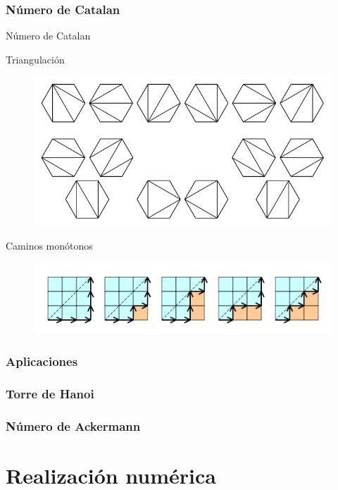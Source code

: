 \documentclass[spanish, utf8,handout]{beamer} %
\theoremstyle{definition}
\begin{document}
\subsubsection{Número de Catalan}
\begin{frame}{Número de Catalan}
	\begin{block}{Triangulación}
		\begin{figure}
		\centering
		 \includegraphics[scale=0.15]{ca1}
		\end{figure}
	\end{block}
\begin{block}{Caminos monótonos}
	\begin{figure}
		\centering
		\includegraphics[scale=0.25]{ca2}
	\end{figure}
\end{block}
\end{frame}
\begin{frame}
	\frametitle{Aplicaciones}
\end{frame}
\subsubsection{Torre de Hanoi}
\subsubsection{Número de Ackermann}

\section{Realización numérica}
\end{document}
